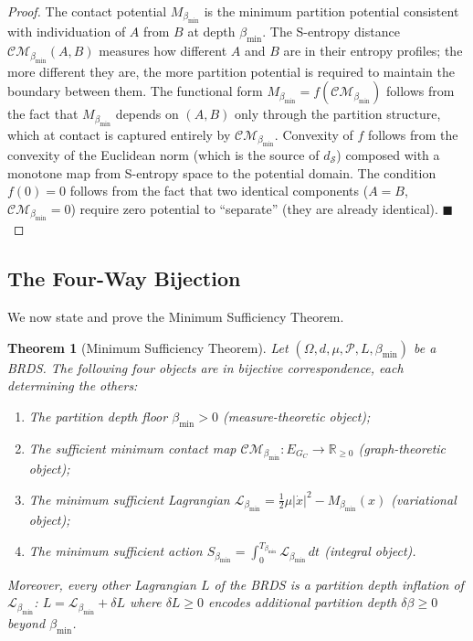 \documentclass[12pt, a4paper]{article}
\theoremstyle{plain}
\newtheorem{theorem}{Theorem}[section]
\theoremstyle{definition}
\theoremstyle{remark}
\newcommand{\bmin}{\beta_{\min}}
\newcommand{\Lmin}{\mathcal{L}_{\bmin}}
\newcommand{\Smin}{S_{\bmin}}
\newcommand{\CM}{\mathcal{CM}}
\newcommand{\dS}{d_{\mathcal{S}}}
\newcommand{\reals}{\mathbb{R}}
\newcommand{\Pcal}{\mathcal{P}}
\newcommand{\half}{\tfrac{1}{2}}
\newcommand{\qed}{\hfill$\blacksquare$}
\begin{document}
\begin{proof}
The contact potential $M_{\bmin}$ is the minimum partition potential consistent
with individuation of $A$ from $B$ at depth $\bmin$. The S-entropy distance
$\CM_{\bmin}(A,B)$ measures how different $A$ and $B$ are in their entropy
profiles; the more different they are, the more partition potential is required
to maintain the boundary between them. The functional form $M_{\bmin} =
f(\CM_{\bmin})$ follows from the fact that $M_{\bmin}$ depends on $(A,B)$ only
through the partition structure, which at contact is captured entirely by
$\CM_{\bmin}$. Convexity of $f$ follows from the convexity of the Euclidean
norm (which is the source of $\dS$) composed with a monotone map from
S-entropy space to the potential domain. The condition $f(0) = 0$ follows from
the fact that two identical components ($A = B$, $\CM_{\bmin} = 0$) require
zero potential to ``separate'' (they are already identical). \qed
\end{proof}

\subsection{The Four-Way Bijection}

We now state and prove the Minimum Sufficiency Theorem.

\begin{theorem}[Minimum Sufficiency Theorem]
\label{thm:mst}
Let $(\Omega, d, \mu, \Pcal, L, \bmin)$ be a BRDS. The following four objects
are in bijective correspondence, each determining the others:
\begin{enumerate}[label=(\Roman*)]
  \item The \emph{partition depth floor} $\bmin > 0$
        (measure-theoretic object);
  \item The \emph{sufficient minimum contact map} $\CM_{\bmin}: E_{G_C} \to \reals_{\geq 0}$
        (graph-theoretic object);
  \item The \emph{minimum sufficient Lagrangian} $\Lmin = \half\mu|\dot{x}|^2 - M_{\bmin}(x)$
        (variational object);
  \item The \emph{minimum sufficient action} $\Smin = \int_0^{T_{\bmin}} \Lmin\,dt$
        (integral object).
\end{enumerate}
Moreover, every other Lagrangian $L$ of the BRDS is a \emph{partition depth
inflation} of $\Lmin$: $L = \Lmin + \delta L$ where $\delta L \geq 0$
encodes additional partition depth $\delta\beta \geq 0$ beyond $\bmin$.
\end{theorem}
\end{document}

